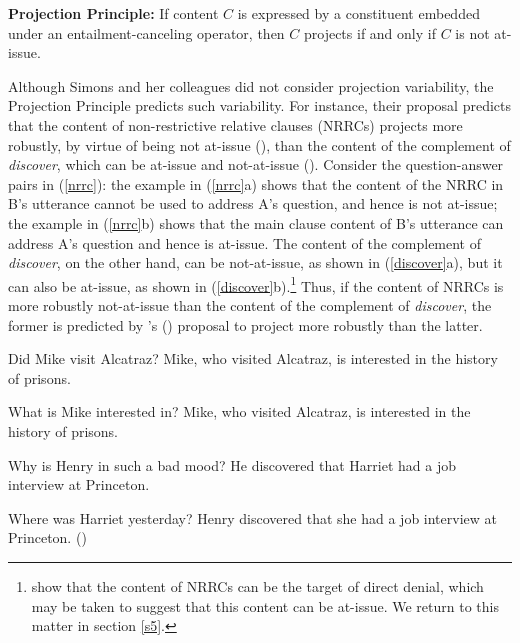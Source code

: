 \documentclass[11pt,fleqn]{article}
\newcommand{\6}{\mbox{$[\hspace*{-.6mm}[$}}
\newcommand{\9}{\mbox{$]\hspace*{-.6mm}]$}}
\def\infelic{{\leavevmode\llap{\#}}}
\newcommand{\citetpos}[1]{\citeauthor{#1}'s (\citeyear{#1})}
\begin{document}
\begin{exe}
\ex\label{pp} {\bf Projection Principle:} If content $C$ is expressed by a constituent embedded under an entailment-canceling operator, then $C$ projects if and only if $C$ is not at-issue.

\end{exe} 
Although Simons and her colleagues did not consider projection variability, the Projection Principle predicts such variability. For instance, their proposal predicts that the content of non-restrictive relative clauses (NRRCs) projects more robustly, by virtue of being not at-issue (\citealt{potts05}), than the content of the complement of {\em discover}, which can be at-issue and not-at-issue (\citealt{simons07}). Consider the question-answer pairs in (\ref{nrrc}): the example in (\ref{nrrc}a) shows that the content of the NRRC in B's utterance cannot be used to address A's question, and hence is not at-issue; the example in (\ref{nrrc}b) shows that the main clause content of B's utterance can address A's question and hence is at-issue. The content of the complement of {\em discover}, on the other hand, can be not-at-issue, as shown in (\ref{discover}a), but it can also be at-issue, as shown in (\ref{discover}b).\footnote{\citet{syrett-koev2015} show that the content of NRRCs can be the target of direct denial, which may be taken to suggest that this content can be at-issue. We return to this matter in section \ref{s5}.} Thus, if the content of NRRCs is more robustly not-at-issue than the content of the complement of {\em discover}, the former is predicted by \citetpos{brst-salt10} proposal to project more robustly than the latter. 

\begin{exe}
\ex\label{nrrc}
\begin{xlist}
\ex
\begin{xlist}
 Did Mike visit Alcatraz?
 \infelic Mike, who visited Alcatraz, is interested in the history of prisons.
\end{xlist}


\ex
\begin{xlist}
 What is Mike interested in?
 Mike, who visited Alcatraz, is interested in the history of prisons.
\end{xlist}


\end{xlist}

\ex\label{discover}
\begin{xlist}

\ex
\begin{xlist}
 Why is Henry in such a bad mood?
 He discovered that Harriet had a job interview at Princeton. 
\end{xlist}

\ex
\begin{xlist}
 Where was Harriet yesterday?
 Henry discovered that she had a job interview at Princeton. \hfill (\citealt[1035]{simons07})
\end{xlist}
\end{xlist}
\end{exe}
\end{document}
